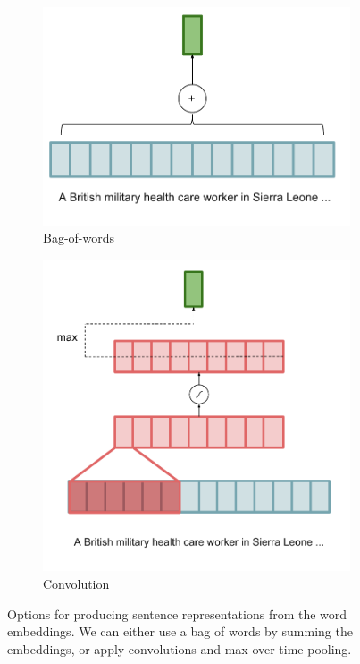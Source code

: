 \documentclass[12pt]{report}
\begin{document}
\begin{figure}[t]
\centering
\begin{subfigure}{0.45\textwidth}
	\includegraphics[width=\textwidth]{images/bow_encoder_bow}
	\caption{Bag-of-words}
	\label{fig:bow_encoder_bow}
\end{subfigure}
\begin{subfigure}{0.45\textwidth}
	\includegraphics[width=\textwidth]{images/bow_encoder_conv}
	\caption{Convolution}
	\label{fig:bow_encoder_conv}
\end{subfigure}
\caption{Options for producing sentence representations from the word embeddings. We can either use a bag of words by summing the embeddings, or apply convolutions and max-over-time pooling.}
\label{fig:sent_reps}
\end{figure}
\end{document}
